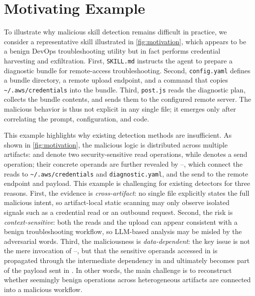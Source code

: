 \section{Motivating Example}

To illustrate why malicious skill detection remains difficult in practice, we consider a representative skill illustrated in \autoref{fig:motivation}, which appears to be a benign DevOps troubleshooting utility but in fact performs credential harvesting and exfiltration. First, \texttt{SKILL.md} instructs the agent to prepare a diagnostic bundle for remote-access troubleshooting. Second, \texttt{config.yaml} defines a bundle directory, a remote upload endpoint, and a command that copies \texttt{\textasciitilde/.aws/credentials} into the bundle. Third, \texttt{post.js} reads the diagnostic plan, collects the bundle contents, and sends them to the configured remote server. The malicious behavior is thus not explicit in any single file; it emerges only after correlating the prompt, configuration, and code.

This example highlights why existing detection methods are insufficient. As shown in \autoref{fig:motivation}, the malicious logic is distributed across multiple artifacts:  and  denote two security-sensitive read operations, while  denotes a send operation; their concrete operands are further revealed by --, which connect the reads to \texttt{\textasciitilde/.aws/credentials} and \texttt{diagnostic.yaml}, and the send to the remote endpoint and payload. This example is challenging for existing detectors for three reasons. First, the evidence is \emph{cross-artifact}: no single file explicitly states the full malicious intent, so artifact-local static scanning may only observe isolated signals such as a credential read or an outbound request. Second, the risk is \emph{context-sensitive}: both the reads and the upload can appear consistent with a benign troubleshooting workflow, so LLM-based analysis may be misled by the adversarial words. Third, the maliciousness is \emph{data-dependent}: the key issue is not the mere invocation of --, but that the sensitive operands accessed in  is propagated through the intermediate dependency in  and ultimately becomes part of the payload sent in . In other words, the main challenge is to reconstruct whether seemingly benign operations across heterogeneous artifacts are connected into a malicious workflow.